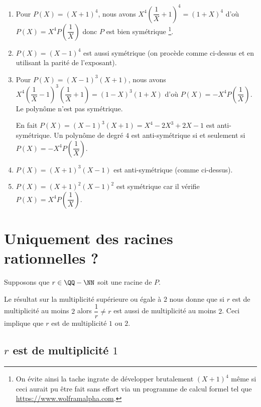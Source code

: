 \documentclass[12pt]{amsart}
\begin{document}
\begin{enumerate}
	\item Pour $P(X) = (X + 1)^4$, nous avons
	      $X^4 \left( \dfrac1X + 1\right)^4 = (1 + X)^4$ 
	      d'où
	      $P(X) = X^4 P\left( \dfrac1X \right)$
	      donc $P$ est bien symétrique
	      \footnote{
	      	On évite ainsi la tache ingrate de développer brutalement $(X + 1)^4$ même si ceci aurait pu être fait sans effort via un programme de calcul formel tel que \url{https://www.wolframalpha.com}.
		  }.

	\item $P(X) = (X - 1)^4$ est aussi symétrique (on procède comme ci-dessus et en utilisant la parité de l'exposant).
	
	\item Pour $P(X) = (X - 1)^3 (X + 1)$, nous avons
	      $X^4 \left( \dfrac1X - 1\right)^3 \left( \dfrac1X + 1\right)
	      = (1 - X)^3 (1 + X)$
	      d'où
	      $P(X) = - X^4 P\left( \dfrac1X \right)$.
	      Le polynôme n'est pas symétrique.

	      \noindent En fait $P(X) = (X - 1)^3 (X + 1) = X^4 - 2 X^3 + 2 X - 1$ est anti-symétrique. 
	      Un polynôme de degré $4$ est anti-symétrique si et seulement si  $P(X) = - X^4 P\left( \dfrac1X \right)$.
	
	\item $P(X) = (X + 1)^3 (X - 1)$ est anti-symétrique (comme ci-dessus).

	\item $P(X) = (X + 1)^2 (X - 1)^2$ est symétrique car il vérifie $P(X) = X^4 P\left( \dfrac1X \right)$.
\end{enumerate}


\section{Uniquement des racines rationnelles ?}

Supposons que $r \in \QQ - \NN$ soit une racine de $P$.

\medskip

Le résultat sur la multiplicité supérieure ou égale à $2$ nous donne que si $r$ est de multiplicité au moins $2$ alors $\dfrac1r \neq r$ est aussi de multiplicité au moins $2$.
Ceci implique que $r$ est de multiplicité $1$ ou $2$.



\subsection*{$r$ est de multiplicité $1$}
\end{document}

